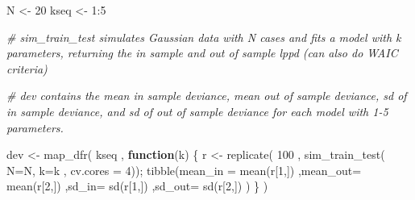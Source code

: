 \documentclass[
]{book}
\newenvironment{Shaded}{\begin{snugshade}}{\end{snugshade}}
\newcommand{\AttributeTok}[1]{\textcolor[rgb]{0.77,0.63,0.00}{#1}}
\newcommand{\CommentTok}[1]{\textcolor[rgb]{0.56,0.35,0.01}{\textit{#1}}}
\newcommand{\ControlFlowTok}[1]{\textcolor[rgb]{0.13,0.29,0.53}{\textbf{#1}}}
\newcommand{\DecValTok}[1]{\textcolor[rgb]{0.00,0.00,0.81}{#1}}
\newcommand{\FunctionTok}[1]{\textcolor[rgb]{0.00,0.00,0.00}{#1}}
\newcommand{\NormalTok}[1]{#1}
\newcommand{\OtherTok}[1]{\textcolor[rgb]{0.56,0.35,0.01}{#1}}
\newcommand{\SpecialCharTok}[1]{\textcolor[rgb]{0.00,0.00,0.00}{#1}}
\begin{document}
\begin{Shaded}
\begin{Highlighting}[]
\NormalTok{N }\OtherTok{\textless{}{-}} \DecValTok{20} 
\NormalTok{kseq }\OtherTok{\textless{}{-}} \DecValTok{1}\SpecialCharTok{:}\DecValTok{5} 

\CommentTok{\# sim\_train\_test simulates Gaussian data with N cases and fits a model with k parameters, returning the in sample and out of sample lppd (can also do WAIC criteria)}

\CommentTok{\# dev contains the mean in sample deviance, mean out of sample deviance, sd of in sample deviance, and sd of out of sample deviance for each model with 1{-}5 parameters.  }

\NormalTok{dev }\OtherTok{\textless{}{-}} \FunctionTok{map\_dfr}\NormalTok{( kseq , }\ControlFlowTok{function}\NormalTok{(k) \{}
\NormalTok{  r }\OtherTok{\textless{}{-}} \FunctionTok{replicate}\NormalTok{( }\DecValTok{100}\NormalTok{ , }\FunctionTok{sim\_train\_test}\NormalTok{( }\AttributeTok{N=}\NormalTok{N, }\AttributeTok{k=}\NormalTok{k , }\AttributeTok{cv.cores =} \DecValTok{4}\NormalTok{)); }
  \FunctionTok{tibble}\NormalTok{(}\AttributeTok{mean\_in =} \FunctionTok{mean}\NormalTok{(r[}\DecValTok{1}\NormalTok{,]) ,}\AttributeTok{mean\_out=} \FunctionTok{mean}\NormalTok{(r[}\DecValTok{2}\NormalTok{,]) ,}\AttributeTok{sd\_in=} \FunctionTok{sd}\NormalTok{(r[}\DecValTok{1}\NormalTok{,]) ,}\AttributeTok{sd\_out=} \FunctionTok{sd}\NormalTok{(r[}\DecValTok{2}\NormalTok{,]) )}
\NormalTok{\} )}


\end{Highlighting}
\end{Shaded}
\end{document}
